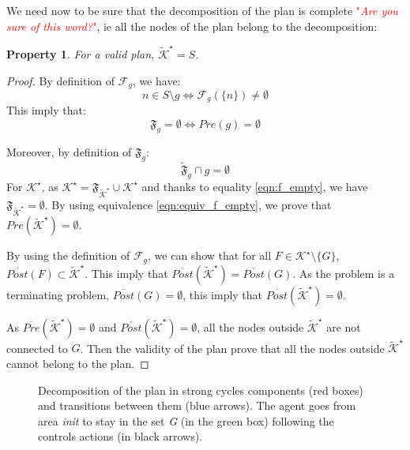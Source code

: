 \documentclass{article}
\newcommand\comment[1]{\textcolor{red}{"\textit{#1}"}}
\newtheorem{property}{Property}
\theoremstyle{named}
\newcommand{\propsymbol}{\( \blacklozenge \)}
\newenvironment{prop}[0]
    {\begin{samepage}
    \begin{property}
    \renewcommand{\qedsymbol}{\propsymbol}\pushQED{\qed}
    }
    {
    \popQED %
    \end{property} 
    \end{samepage}
    }
\newcommand{\outpost}{ \ensuremath{\overline{Post} } }
\newcommand{\inpre}{ \ensuremath{\overline{Pre} } }
\begin{document}
We need now to be sure that the decomposition of the plan is complete \comment{Are you sure of this word?}, ie all the nodes of the plan belong to the decomposition:
\begin{prop}
For a valid plan, $\tilde{\mathcal{K}}^\star = S$.
\end{prop}
\begin{proof}

By definition of $\mathcal{F}_g$, we have:
\begin{equation}
n \in S \setminus g \Leftrightarrow \mathcal{F}_g(\{n\}) \neq \emptyset
\end{equation}
This imply that:
\begin{equation} \label{eqn:equiv_f_empty}
\mathfrak{F}_g = \emptyset \Leftrightarrow Pre(g) = \emptyset
\end{equation}

Moreover, by definition of $\mathfrak{F}_g$:
\begin{equation} \label{eqn:f_empty}
\tilde{\mathfrak{F}}_g \cap g = \emptyset
\end{equation}
For $\mathcal{K}^\star$, as $\mathcal{K}^\star = \mathfrak{F}_{\tilde{\mathcal{K}}^\star} \cup \mathcal{K}^\star$ and thanks to equality \ref{eqn:f_empty}, we have $\mathfrak{F}_{\tilde{\mathcal{K}}^\star} = \emptyset$.  
By using equivalence \ref{eqn:equiv_f_empty}, we prove that $Pre(\tilde{\mathcal{K}}^\star) = \emptyset$.

By using the definition of $\mathcal{F}_g$,
we can show that for all $F \in \mathcal{K}^\star \setminus \{G\}$, $\outpost(F) \subset \tilde{\mathcal{K}}^\star$.
This imply that $\outpost(\tilde{\mathcal{K}}^\star) = \outpost(G)$.
As the problem is a terminating problem, $\outpost(G) = \emptyset$, this imply that 
$\outpost(\tilde{\mathcal{K}}^\star)  = \emptyset$.

As $\inpre(\tilde{\mathcal{K}}^\star)  = \emptyset$ and $\outpost(\tilde{\mathcal{K}}^\star)  = \emptyset$, all the nodes outside $\tilde{\mathcal{K}}^\star$ are not connected to $G$.
Then the validity of the plan prove that all the nodes outside   $\tilde{\mathcal{K}}^\star$ cannot belong to the plan.
\end{proof}


\begin{figure}
	\center
	
	\caption{Decomposition of the plan in strong cycles components (red boxes) and transitions between them (blue arrows). The agent goes from area \textit{init} to stay in the set \textit{G} (in the green box) following the controls actions (in black arrows).}
	\label{fig:environment}
\end{figure}
\end{document}
